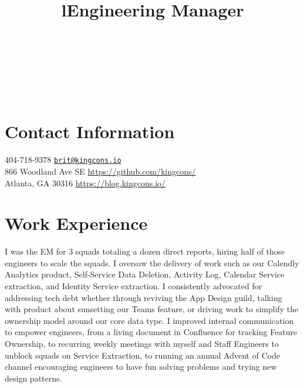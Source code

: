 \documentclass[margintitle,line]{res}
\begin{document}

\begin{resume}

\begin{format}
\\
\title{l}\\
\body\\
\end{format}



\section{Contact Information}

404-718-9378 \hfill \href{mailto:brit@kingcons.io}{\nolinkurl{brit@kingcons.io}} \\
866 Woodland Ave SE \hfill \url{https://github.com/kingcons/} \\
Atlanta, GA 30316 \hfill \url{https://blog.kingcons.io/} \\


\section{Work Experience}

\title{Engineering Manager}
\begin{position}
  I was the EM for 3 squads totaling a dozen direct reports, hiring half of those engineers to scale the squads.
  I oversaw the delivery of work such as our Calendly Analytics product, Self-Service Data Deletion, Activity Log, Calendar Service extraction, and Identity Service extraction.
  I consistently advocated for addressing tech debt whether through reviving the App Design guild, talking with product about sunsetting our Teams feature, or driving work to simplify the ownership model around our core data type.
  I improved internal communication to empower engineers, from a living document in Confluence for tracking Feature Ownership, to recurring weekly meetings with myself and Staff Engineers to unblock squads on Service Extraction, to running an annual Advent of Code channel encouraging engineers to have fun solving problems and trying new design patterns.
\end{position}


\end{resume}
\end{document}
